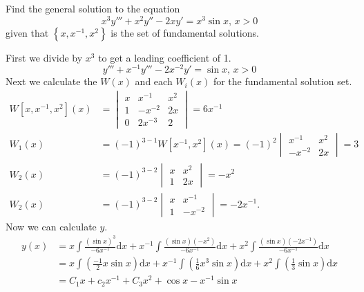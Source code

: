 \begin{example}
	Find the general solution to the equation
	\begin{equation*}
		x^3y''' + x^2y'' - 2xy' = x^3\sin{x} \text{, } x > 0
	\end{equation*}
	given that $\left\{x, x^{-1}, x^2\right\}$ is the set of fundamental solutions.
\end{example}
\noindent
First we divide by $x^3$ to get a leading coefficient of 1.
\begin{equation*}
	y''' + x^{-1}y''' - 2x^{-2}y' = \sin{x} \text{, } x > 0
\end{equation*}
Next we calculate the $W(x)$ and each $W_i(x)$ for the fundamental solution set.
\begin{align*}
	W[x,x^{-1}, x^2](x) &= \begin{vmatrix}
		x & x^{-1} & x^2 \\
		1 & -x^{-2} & 2x \\
		0 & 2x^{-3} & 2
	\end{vmatrix} = 6x^{-1} \\
	W_1(x) &= (-1)^{3-1}W[x^{-1}, x^2](x) = (-1)^{2}\begin{vmatrix}
		x^{-1} & x^2 \\
		-x^{-2} & 2x
	\end{vmatrix} = 3 \\
	W_2(x) &= (-1)^{3-2}\begin{vmatrix}
		x & x^{2} \\
		1 & 2x
	\end{vmatrix} = -x^2 \\
	W_2(x) &= (-1)^{3-2}\begin{vmatrix}
		x & x^{-1} \\
		1 & -x^{-2}
	\end{vmatrix} = -2x^{-1}.
\end{align*}
Now we can calculate $y$.
\begin{align*}
	y(x) &= x\int{\frac{(\sin{x})^3}{-6x^{-1}} \mathrm{d}x} + x^{-1}\int{\frac{(\sin{x})(-x^2)}{-6x^{-1}} \mathrm{d}x} + x^2\int{\frac{(\sin{x})(-2x^{-1})}{-6x^{-1}} \mathrm{d}x} \\
	&= x\int{\left(\frac{-1}{2}x\sin{x}\right)\mathrm{d}x} + x^{-1}\int{\left(\frac{1}{6}x^3\sin{x}\right)\mathrm{d}x} + x^2\int{\left(\frac{1}{3}\sin{x}\right)\mathrm{d}x} \\
	&= C_1x + c_2x^{-1} + C_3x^2 + \cos{x} - x^{-1}\sin{x}
\end{align*}